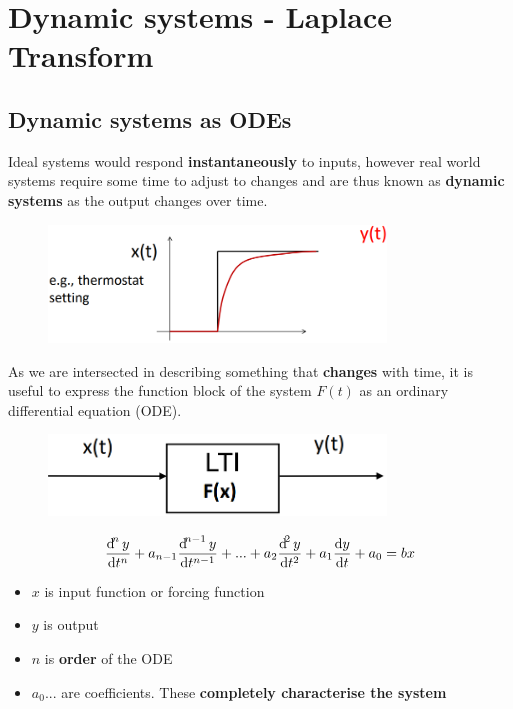 \documentclass[class=report, crop=false, 12pt,a4paper, tikz, border=4mm]{standalone}
\begin{document}
\section{Dynamic systems - Laplace Transform}
\subsection{Dynamic systems as ODEs}
Ideal systems would respond \textbf{instantaneously} to inputs, however real world systems require some time to adjust to changes and are thus known as \textbf{dynamic systems} as the output changes over time.
\begin{figure}[H]
  \centering
  \includegraphics[width = 0.8\textwidth]{../img/graphs5.png}
\end{figure}
As we are intersected in describing something that \textbf{changes} with time, it is useful to express the function block of the system $F(t)$ as an ordinary differential equation (ODE).
\begin{figure}[H]
  \centering
  \includegraphics[width = 0.8\textwidth]{../img/blockdiagram10.png}
\end{figure}
\begin{equation}
  \frac{\dif^n y}{\dif t^n} + a_{n-1}\frac{\dif^{n-1}y}{\dif t^{n-1}} + ... + a_2 \frac{\dif^2y}{\dif t^2} + a_1 \frac{\dif y}{\dif t} + a_0 = bx
\end{equation}
\begin{itemize}
  \item $x$ is input function or forcing function
  \item $y$ is output
  \item $n$ is \textbf{order} of the ODE
  \item $a_0...$ are coefficients. These \textbf{completely characterise the system}
\end{itemize}
\end{document}
